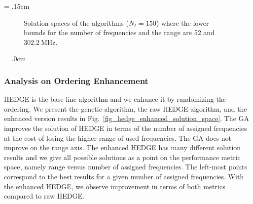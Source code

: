 \documentclass[10pt,twocolumn,twoside]{JCNtran}
\newcommand{\tbirkan}[1]{#1}
\newcommand{\linkl}{\ell}
\newcommand{\numlink}{N_{\linkl}}
\begin{document}
\subfigcapmargin = .15cm
\begin{figure*}[!t]
\begin{center}
\end{center}
\caption{Solution spaces of the algorithms ($\numlink = 150$) where the lower bounds for the number of frequencies and the range are 52 and $\SI{302.2}{\mega\hertz}$.}
\label{fig_solution_spaces}
\end{figure*}
\subfigcapmargin = .0cm


\subsubsection{Analysis on Ordering Enhancement}
\label{subsec_effect_of_bf}
HEDGE is the base-line algorithm and we enhance it by randomizing the ordering. We present the genetic algorithm, the raw HEDGE algorithm, and the enhanced version results in Fig.~\ref{fig_hedge_enhanced_solution_space}. The GA improves the solution of HEDGE in terms of the number of assigned frequencies at the cost of losing the higher range of used frequencies. The GA does not improve on the range axis. The enhanced HEDGE has many different solution results and we give all possible solutions as a point on the performance metric space, namely range versus number of assigned frequencies. The left-most points correspond to the best results for a given number of assigned frequencies. With the enhanced HEDGE, we observe improvement in terms of both metrics \tbirkan{compared to raw HEDGE}.
\end{document}
